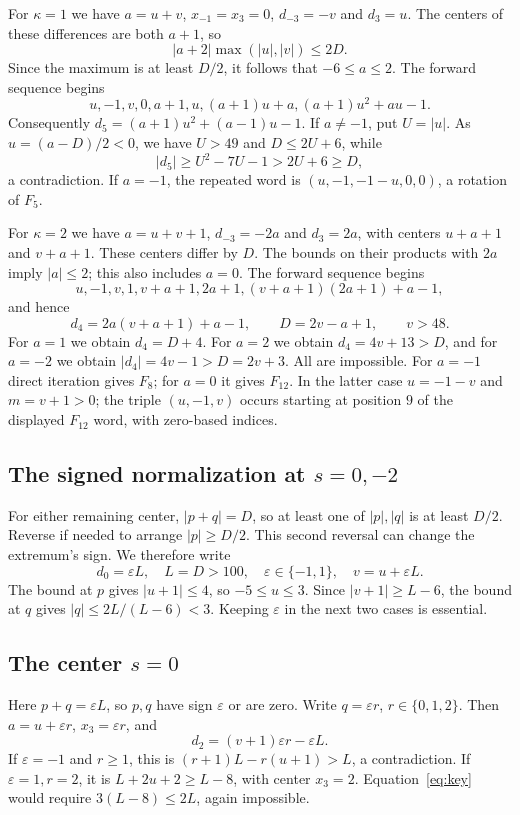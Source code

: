 For $\kappa=1$ we have $a=u+v$, $x_{-1}=x_3=0$,
$d_{-3}=-v$ and $d_3=u$. The centers of these differences
are both $a+1$, so
\[
 |a+2|\max(|u|,|v|)\le2D.
\]
Since the maximum is at least $D/2$, it follows that
$-6\le a\le2$. The forward sequence begins
\[
 u,-1,v,0,a+1,u,(a+1)u+a,(a+1)u^2+au-1.
\]
Consequently $d_5=(a+1)u^2+(a-1)u-1$.
If $a\ne-1$, put $U=|u|$. As $u=(a-D)/2<0$, we have
$U>49$ and $D\le2U+6$, while
\[
 |d_5|\ge U^2-7U-1>2U+6\ge D,
\]
a contradiction. If $a=-1$, the repeated word is
$(u,-1,-1-u,0,0)$, a rotation of $F_5$.

For $\kappa=2$ we have $a=u+v+1$, $d_{-3}=-2a$ and
$d_3=2a$, with centers $u+a+1$ and $v+a+1$.
These centers differ by $D$. The bounds on their products
with $2a$ imply $|a|\le2$; this also includes $a=0$.
The forward sequence begins
\[
 u,-1,v,1,v+a+1,2a+1,(v+a+1)(2a+1)+a-1,
\]
and hence
\[
 d_4=2a(v+a+1)+a-1,\qquad D=2v-a+1,\qquad v>48.
\]
For $a=1$ we obtain $d_4=D+4$. For $a=2$ we obtain
$d_4=4v+13>D$, and for $a=-2$ we obtain
$|d_4|=4v-1>D=2v+3$. All are impossible.
For $a=-1$ direct iteration gives $F_8$; for $a=0$ it
gives $F_{12}$. In the latter case $u=-1-v$ and $m=v+1>0$;
the triple $(u,-1,v)$ occurs starting at position $9$ of
the displayed $F_{12}$ word, with zero-based indices.

\subsection{The signed normalization at \texorpdfstring{$s=0,-2$}{s=0,-2}}
For either remaining center, $|p+q|=D$, so at least one of
$|p|,|q|$ is at least $D/2$. Reverse if needed to arrange
$|p|\ge D/2$. This second reversal can change the extremum's
sign. We therefore write
\begin{equation}
 d_0=\varepsilon L,\quad L=D>100,\quad
 \varepsilon\in\{-1,1\},\quad v=u+\varepsilon L.
 \label{eq:signed}
\end{equation}
The bound at $p$ gives $|u+1|\le4$, so $-5\le u\le3$.
Since $|v+1|\ge L-6$, the bound at $q$ gives
$|q|\le2L/(L-6)<3$. Keeping $\varepsilon$ in the next
two cases is essential.

\subsection{The center \texorpdfstring{$s=0$}{s=0}}
Here $p+q=\varepsilon L$, so $p,q$ have sign
$\varepsilon$ or are zero. Write $q=\varepsilon r$,
$r\in\{0,1,2\}$. Then $a=u+\varepsilon r$,
$x_3=\varepsilon r$, and
\[
 d_2=(v+1)\varepsilon r-\varepsilon L.
\]
If $\varepsilon=-1$ and $r\ge1$, this is
$(r+1)L-r(u+1)>L$, a contradiction.
If $\varepsilon=1,r=2$, it is $L+2u+2\ge L-8$,
with center $x_3=2$. Equation~\eqref{eq:key} would require
$3(L-8)\le2L$, again impossible.

